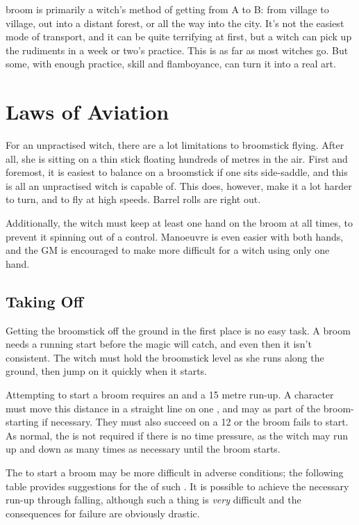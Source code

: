 
 broom is primarily a witch's method of getting from A to B: from village to village, out into a distant forest, or all the way into the city.
It's not the easiest mode of transport, and it can be quite terrifying at first, but a witch can pick up the rudiments in a week or two's practice.
This is as far as most witches go.
But some, with enough practice, skill and flamboyance, can turn it into a real art.

\section{Laws of Aviation}

For an unpractised witch, there are a lot limitations to broomstick flying.
After all, she is sitting on a thin stick floating hundreds of metres in the air.
First and foremost, it is easiest to balance on a broomstick if one sits side-saddle, and this is all an unpractised witch is capable of.
This does, however, make it a lot harder to turn, and to fly at high speeds.
Barrel rolls are right out.

Additionally, the witch must keep at least one hand on the broom at all times, to prevent it spinning out of a control.
Manoeuvre is even easier with both hands, and the GM is encouraged to make  {\tests} more difficult for a witch using only one hand.

\subsection{Taking Off}

Getting the broomstick off the ground in the first place is no easy task.
A broom needs a running start before the magic will catch, and even then it isn't consistent.
The witch must hold the broomstick level as she runs along the ground, then jump on it quickly when it starts.

Attempting to start a broom requires an {\action} and a 15 metre run-up.
A character must move this distance in a straight line on one {\turn}, and may  as part of the broom-starting {\action} if necessary.
They must also succeed on a {\tn} 12  {\test} or the broom fails to start.
As normal, the {\test} is not required if there is no time pressure, as the witch may run up and down as many times as necessary until the broom starts.

The {\test} to start a broom may be more difficult in adverse conditions; the following table provides suggestions for the {\tn} of such {\tests}.
It is possible to achieve the necessary run-up through falling, although such a thing is \emph{very} difficult and the consequences for failure are obviously drastic.

